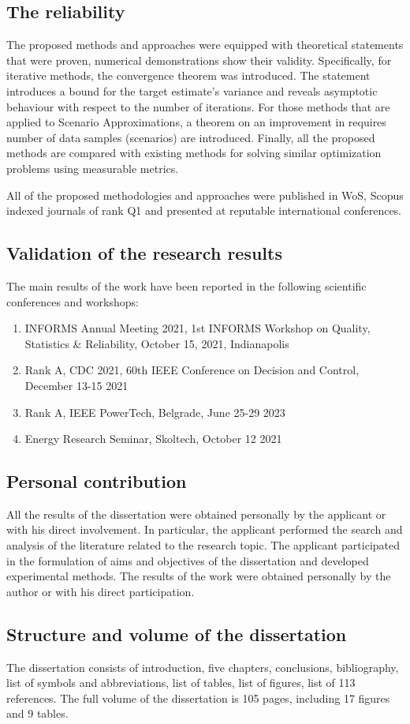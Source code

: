 \subsection*{The reliability}
The proposed methods and approaches were equipped with theoretical statements that were proven, numerical demonstrations show their validity. Specifically, for iterative methods, the convergence theorem was introduced. The statement introduces a bound for the target estimate's variance and reveals asymptotic behaviour with respect to the number of iterations. For those methods that are applied to Scenario Approximations, a theorem on an improvement in requires number of data samples (scenarios) are introduced. Finally, all the proposed methods are compared with existing methods for solving similar optimization problems using measurable metrics. 

All of the proposed methodologies and approaches were published in WoS, Scopus indexed journals of rank Q1 and presented at reputable international conferences.
\subsection*{Validation of the research results}
The main results of the work have been reported in the following scientific conferences and workshops:

\begin{enumerate}
    \item INFORMS Annual Meeting 2021, 1st INFORMS Workshop on Quality, Statistics \& Reliability, October 15, 2021, Indianapolis
    \item Rank A, CDC 2021, 60th IEEE Conference on Decision and Control, December 13-15 2021
    \item Rank A, IEEE PowerTech, Belgrade, June 25-29 2023
    \item Energy Research Seminar, Skoltech, October 12 2021
\end{enumerate}

\subsection*{Personal contribution} All the results of the dissertation were obtained personally by the 
applicant or with his direct involvement. In particular, the applicant performed the search 
and  analysis  of  the  literature  related  to  the  research  topic.  The  applicant  participated in the formulation of aims and objectives of 
the  dissertation  and  developed  experimental  methods.  The  results  of  the  work  were obtained personally by the author or with his direct participation. 

\subsection*{Structure and volume of the dissertation} The dissertation consists of introduction, five chapters, conclusions, bibliography, list of symbols and abbreviations, list of tables, list of figures, list of 113 references. The full 
volume of the dissertation is 105 pages, including 17 figures and 9 tables.